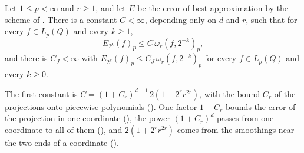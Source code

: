 \begin{theorem}
\label{thm:cube-jackson}
\leanok
{}
Let $1 \leq p < \infty$ and $r \geq 1$, and let $E$ be the error of best approximation by the
scheme of . There is a constant $C < \infty$, depending only on $d$ and $r$,
such that for every $f \in L_p(Q)$ and every $k \geq 1$,
\[
  E_{2^k}(f)_p \leq C \, \omega_r(f, 2^{-k})_p ,
\]
and there is $C_J < \infty$ with $E_{2^k}(f)_p \leq C_J \, \omega_r(f, 2^{-k})_p$ for every
$f \in L_p(Q)$ and every $k \geq 0$.
\end{theorem}

The first constant is $C = (1 + C_r)^{d+1} \, 2 (1 + 2^r r^{2r})$, with the bound $C_r$ of the
projections onto piecewise polynomials (). One factor $1 + C_r$ bounds the error
of the projection in one coordinate (), the power $(1 + C_r)^d$ passes from one
coordinate to all of them (), and $2 (1 + 2^r r^{2r})$ comes from the
smoothings near the two ends of a coordinate ().

